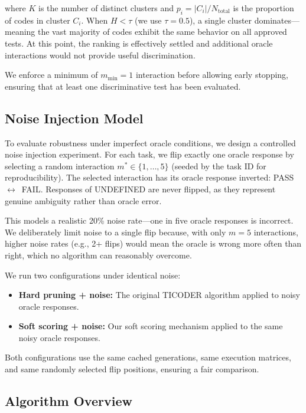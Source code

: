 \documentclass[conference]{IEEEtran}
\begin{document}
where $K$ is the number of distinct clusters and $p_i = |C_i| / N_{\text{total}}$ is the proportion of codes in cluster $C_i$. When $H < \tau$ (we use $\tau = 0.5$), a single cluster dominates---meaning the vast majority of codes exhibit the same behavior on all approved tests. At this point, the ranking is effectively settled and additional oracle interactions would not provide useful discrimination.

We enforce a minimum of $m_{\min} = 1$ interaction before allowing early stopping, ensuring that at least one discriminative test has been evaluated.

\subsection{Noise Injection Model}

To evaluate robustness under imperfect oracle conditions, we design a controlled noise injection experiment. For each task, we flip exactly one oracle response by selecting a random interaction $m^* \in \{1, \ldots, 5\}$ (seeded by the task ID for reproducibility). The selected interaction has its oracle response inverted: PASS~$\leftrightarrow$~FAIL. Responses of UNDEFINED are never flipped, as they represent genuine ambiguity rather than oracle error.

This models a realistic 20\% noise rate---one in five oracle responses is incorrect. We deliberately limit noise to a single flip because, with only $m=5$ interactions, higher noise rates (e.g., 2+ flips) would mean the oracle is wrong more often than right, which no algorithm can reasonably overcome.

We run two configurations under identical noise:
\begin{itemize}
    \item \textbf{Hard pruning + noise:} The original TICODER algorithm applied to noisy oracle responses.
    \item \textbf{Soft scoring + noise:} Our soft scoring mechanism applied to the same noisy oracle responses.
\end{itemize}

Both configurations use the same cached generations, same execution matrices, and same randomly selected flip positions, ensuring a fair comparison.

\subsection{Algorithm Overview}
\end{document}
